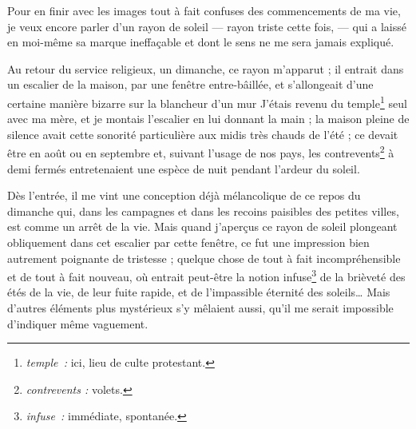 	{Pour en finir avec les images tout à fait confuses des commencements de ma vie, je veux encore parler d’un rayon de soleil — rayon triste cette fois, — qui a laissé en moi-même sa marque ineffaçable et dont le sens ne me sera jamais expliqué.
	
Au retour du service religieux, un dimanche, ce rayon m’apparut ; il entrait dans un escalier de la maison, par une fenêtre entre-bâillée, et s’allongeait d’une certaine manière bizarre sur la blancheur d’un mur
J’étais revenu du temple\footnote{\emph{temple~:} ici, lieu de culte protestant.} seul avec ma mère, et je montais l’escalier en lui donnant la main ; la maison pleine de silence avait cette sonorité particulière aux midis très chauds de l’été ; ce devait être en août ou en septembre et, suivant l’usage de nos pays, les contrevents\footnote{\emph{contrevents :} volets.} à demi fermés entretenaient une espèce de nuit pendant l’ardeur du soleil.

Dès l’entrée, il me vint une conception déjà mélancolique de ce repos du dimanche qui, dans les campagnes et dans les recoins paisibles des petites villes, est comme un arrêt de la vie. Mais quand j’aperçus ce rayon de soleil plongeant obliquement dans cet escalier par cette fenêtre, ce fut une impression bien autrement poignante de tristesse ; quelque chose de tout à fait incompréhensible et de tout à fait nouveau, où entrait peut-être la notion infuse\footnote{\emph{infuse~:} immédiate, spontanée.} de la brièveté des étés de la vie, de leur fuite rapide, et de l’impassible éternité des soleils… Mais d’autres éléments plus mystérieux s’y mêlaient aussi, qu’il me serait impossible d’indiquer même vaguement.

}
